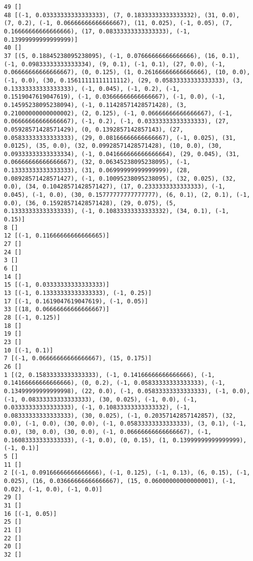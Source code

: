 \documentclass[11pt]{article}
\begin{document}
\begin{Verbatim}[commandchars=\\\{\}]
49 []
48 [(-1, 0.03333333333333333), (7, 0.18333333333333332), (31, 0.0), (7, 0.2), (-1, 0.06666666666666667), (11, 0.025), (-1, 0.05), (7, 0.16666666666666666), (17, 0.08333333333333333), (-1, 0.13999999999999999)]
40 []
37 [(5, 0.18845238095238095), (-1, 0.07666666666666666), (16, 0.1), (-1, 0.09833333333333334), (9, 0.1), (-1, 0.1), (27, 0.0), (-1, 0.06666666666666667), (0, 0.125), (1, 0.26166666666666666), (10, 0.0), (-1, 0.0), (30, 0.15611111111111112), (29, 0.05833333333333333), (3, 0.13333333333333333), (-1, 0.045), (-1, 0.2), (-1, 0.1519047619047619), (-1, 0.03666666666666667), (-1, 0.0), (-1, 0.14595238095238094), (-1, 0.11428571428571428), (3, 0.21000000000000002), (2, 0.125), (-1, 0.06666666666666667), (-1, 0.06666666666666667), (-1, 0.2), (-1, 0.03333333333333333), (27, 0.05928571428571429), (0, 0.1392857142857143), (27, 0.05833333333333333), (29, 0.08166666666666667), (-1, 0.025), (31, 0.0125), (35, 0.0), (32, 0.09928571428571428), (10, 0.0), (30, 0.09333333333333334), (-1, 0.041666666666666664), (29, 0.045), (31, 0.06666666666666667), (32, 0.06345238095238095), (-1, 0.13333333333333333), (31, 0.06999999999999999), (28, 0.08928571428571427), (-1, 0.10095238095238095), (32, 0.025), (32, 0.0), (34, 0.10428571428571427), (17, 0.2333333333333333), (-1, 0.045), (-1, 0.0), (30, 0.15777777777777777), (6, 0.1), (2, 0.1), (-1, 0.0), (36, 0.15928571428571428), (29, 0.075), (5, 0.13333333333333333), (-1, 0.10833333333333332), (34, 0.1), (-1, 0.15)]
8 []
12 [(-1, 0.11666666666666665)]
27 []
24 []
3 []
6 []
14 []
15 [(-1, 0.03333333333333333)]
13 [(-1, 0.13333333333333333), (-1, 0.25)]
17 [(-1, 0.1619047619047619), (-1, 0.05)]
33 [(18, 0.06666666666666667)]
28 [(-1, 0.125)]
18 []
19 []
23 []
10 [(-1, 0.1)]
7 [(-1, 0.06666666666666667), (15, 0.175)]
26 []
1 [(2, 0.15833333333333333), (-1, 0.14166666666666666), (-1, 0.14166666666666666), (0, 0.2), (-1, 0.05833333333333333), (-1, 0.13499999999999998), (22, 0.0), (-1, 0.05833333333333333), (-1, 0.0), (-1, 0.08333333333333333), (30, 0.025), (-1, 0.0), (-1, 0.03333333333333333), (-1, 0.10833333333333332), (-1, 0.08333333333333333), (30, 0.025), (-1, 0.20357142857142857), (32, 0.0), (-1, 0.0), (30, 0.0), (-1, 0.05833333333333333), (3, 0.1), (-1, 0.0), (30, 0.0), (30, 0.0), (-1, 0.06666666666666667), (-1, 0.16083333333333333), (-1, 0.0), (0, 0.15), (1, 0.13999999999999999), (-1, 0.1)]
5 []
11 []
2 [(-1, 0.09166666666666666), (-1, 0.125), (-1, 0.13), (6, 0.15), (-1, 0.025), (16, 0.03666666666666667), (15, 0.06000000000000001), (-1, 0.02), (-1, 0.0), (-1, 0.0)]
29 []
31 []
16 [(-1, 0.05)]
25 []
21 []
22 []
20 []
32 []

\end{Verbatim}
\end{document}
